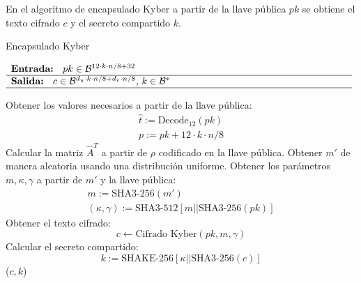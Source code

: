  En el algoritmo de encapsulado Kyber a partir de la llave pública \(pk\) se obtiene el texto cifrado \(c\) y el secreto compartido \(k\). 
\begin{algorithm}[H]
	\small 
	\caption{Encapsulado Kyber}
	$\begin{array}{p{\textwidth}}
		\textbf{Entrada: } \(pk\in \mathcal{B}^{12\cdot k\cdot n/8+32}\)\\ 
		\hline
		\textbf{Salida: } \(c\in \mathcal{B}^{d_u\cdot k\cdot n/8+d_v\cdot n/8}\), \(k\in \mathcal{B}^{*}\)\\ 
		\hline
	\end{array}$
	\begin{algorithmic}[1]
		\State Obtener los valores necesarios a partir de la llave pública:
		\begin{equation}
			\begin{array}{l}
			\hat{t}:=\text{Decode}_{12}(pk)\\
			p:=pk+12\cdot k\cdot n/8
			\end{array} 
		\end{equation}
		\State Calcular la matriz \(\hat{A}^T\) a partir de \(\rho\) codificado en la llave pública.
		\State Obtener \(m'\) de manera aleatoria usando una distribución uniforme.
		\State Obtener los parámetros \(m, \kappa, \gamma\) a partir de \(m'\) y la llave pública:
		\begin{equation}
			\begin{array}{l}
				m:=\text{SHA3-256}(m')\\
				(\kappa,\gamma):=\text{SHA3-512}[m||\text{SHA3-256}(pk)]
			\end{array} 
		\end{equation}
		\State Obtener el texto cifrado:
		\begin{equation}
			c \gets \text{Cifrado Kyber}(pk,m,\gamma)
		\end{equation}
		\State Calcular el secreto compartido:
		\begin{equation}
			k:= \text{SHAKE-256}[\kappa||\text{SHA3-256}(c)]
		\end{equation}
		\State \Return (\(c,k\))
	\end{algorithmic}
\end{algorithm}

